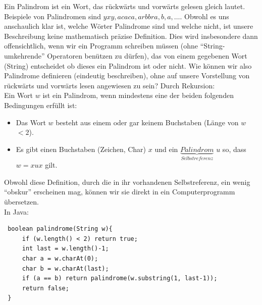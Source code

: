 \begin{bsp}
Ein Palindrom ist ein Wort, das rückwärts und vorwärts gelesen gleich lautet. Beispiele von Palindromen sind $yxy,acaca,arbbra,b,a,\dots$. Obwohl es uns anschaulich klar ist, welche Wörter Palindrome sind und welche nicht, ist unsere Beschreibung keine mathematisch präzise Definition. Dies wird insbesondere dann offensichtlich, wenn wir ein Programm schreiben müssen (ohne ``String-umkehrende'' Operatoren benützen zu dürfen), das von einem gegebenen Wort (String) entscheidet ob dieses ein Palindrom ist oder nicht. Wie können wir also Palindrome definieren (eindeutig beschreiben), ohne auf unsere Vorstellung von rückwärts und vorwärts lesen angewiesen zu sein? Durch Rekursion:\\
Ein Wort $w$ ist ein Palindrom, wenn mindestens eine der beiden folgenden Bedingungen erfüllt ist:
\begin{itemize}
\item Das Wort $w$ besteht aus einem oder gar keinem Buchstaben (Länge von $w$ $<2$).
\item Es gibt einen Buchstaben (Zeichen, Char) $x$ und ein $\underbrace{Palindrom}_{Selbstreferenz}$ $u$ so, dass $w=xux$ gilt.
\end{itemize}
Obwohl diese Definition, durch die in ihr vorhandenen Selbstreferenz, ein wenig ``obskur'' erscheinen mag, können wir sie direkt in ein Computerprogramm übersetzen.\\
In Java:

\lstset{language=Java}
\begin{framed}
\begin{lstlisting}
 boolean palindrome(String w){
     if (w.length() < 2) return true;
     int last = w.length()-1;
     char a = w.charAt(0);
     char b = w.charAt(last);
     if (a == b) return palindrome(w.substring(1, last-1));
     return false;
 }
\end{lstlisting}
\end{framed}
\end{bsp}

